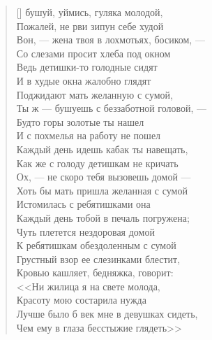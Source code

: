 \settowidth{\versewidth}{Лучше было б век мне в девушках сидеть,}
\begin{verse}[\versewidth]
 бушуй, уймись, гуляка молодой,\\
Пожалей, не рви зипун себе худой\ldotst\\
Вон, --- жена твоя в лохмотьях, босиком, ---\\
Со слезами просит хлеба под окном\ldotse\\
Ведь детишки-то голодные сидят\\
И в худые окна жалобно глядят\ldotst\\
Поджидают мать желанную с сумой,\\
Ты ж --- бушуешь с беззаботной головой, ---\\
Будто горы золотые ты нашел\ldotst\\
И с похмелья на работу не пошел\ldotst\\
Каждый день идешь кабак ты навещать,\\
Как же с голоду детишкам не кричать\ldotsq\\
Ох, --- не скоро тебя вызовешь домой ---\\
Хоть бы мать пришла желанная с сумой\ldotst\\
Истомилась с ребятишками она\\
Каждый день тобой в печаль погружена;\\
Чуть плетется нездоровая домой\\
К ребятишкам обездоленным с сумой\ldotst\\
Грустный взор ее слезинками блестит,\\
Кровью кашляет, бедняжка, говорит:\\
<<Ни жилица я на свете молода,\\
Красоту мою состарила нужда\ldotst\\
Лучше было б век мне в девушках сидеть,\\
Чем ему в глаза бесстыжие глядеть>>\ldotst
\end{verse}

